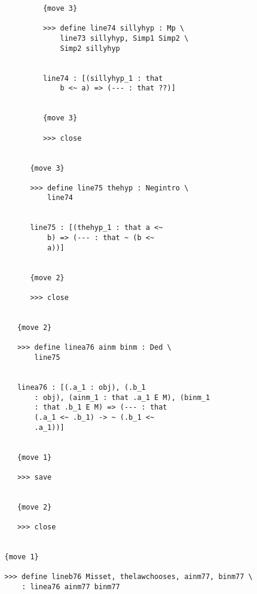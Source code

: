 \documentclass[12pt]{article}
\begin{document}
\begin{verbatim}
            {move 3}

            >>> define line74 sillyhyp : Mp \
                line73 sillyhyp, Simp1 Simp2 \
                Simp2 sillyhyp


            line74 : [(sillyhyp_1 : that 
                b <~ a) => (--- : that ??)]


            {move 3}

            >>> close


         {move 3}

         >>> define line75 thehyp : Negintro \
             line74


         line75 : [(thehyp_1 : that a <~ 
             b) => (--- : that ~ (b <~ 
             a))]


         {move 2}

         >>> close


      {move 2}

      >>> define linea76 ainm binm : Ded \
          line75


      linea76 : [(.a_1 : obj), (.b_1 
          : obj), (ainm_1 : that .a_1 E M), (binm_1 
          : that .b_1 E M) => (--- : that 
          (.a_1 <~ .b_1) -> ~ (.b_1 <~ 
          .a_1))]


      {move 1}

      >>> save


      {move 2}

      >>> close


   {move 1}

   >>> define lineb76 Misset, thelawchooses, ainm77, binm77 \
       : linea76 ainm77 binm77



\end{verbatim}
\end{document}
